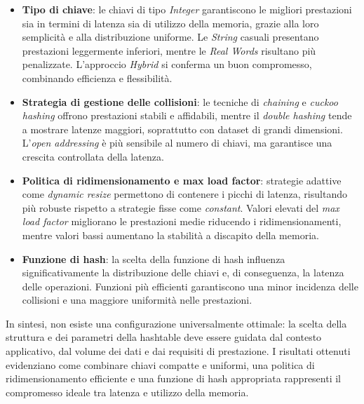 \begin{itemize}
    \item \textbf{Tipo di chiave}: le chiavi di tipo \textit{Integer} garantiscono le migliori prestazioni sia in termini di latenza sia di utilizzo 
    della memoria, grazie alla loro semplicità e alla distribuzione uniforme. Le \textit{String} casuali presentano prestazioni leggermente inferiori, 
    mentre le \textit{Real Words} risultano più penalizzate. L'approccio \textit{Hybrid} si conferma un buon compromesso, combinando efficienza e flessibilità.
    
    \item \textbf{Strategia di gestione delle collisioni}: le tecniche di \textit{chaining} e \textit{cuckoo hashing} offrono prestazioni stabili e affidabili, 
    mentre il \textit{double hashing} tende a mostrare latenze maggiori, soprattutto con dataset di grandi dimensioni. L'\textit{open addressing} 
    è più sensibile al numero di chiavi, ma garantisce una crescita controllata della latenza.
    
    \item \textbf{Politica di ridimensionamento e max load factor}: strategie adattive come \textit{dynamic resize} permettono di contenere i picchi di latenza, 
    risultando più robuste rispetto a strategie fisse come \textit{constant}. Valori elevati del \textit{max load factor} migliorano le prestazioni 
    medie riducendo i ridimensionamenti, mentre valori bassi aumentano la stabilità a discapito della memoria.
    
    \item \textbf{Funzione di hash}: la scelta della funzione di hash influenza significativamente la distribuzione delle chiavi e, di conseguenza, 
    la latenza delle operazioni. Funzioni più efficienti garantiscono una minor incidenza delle collisioni e una maggiore uniformità nelle prestazioni.
\end{itemize}

In sintesi, non esiste una configurazione universalmente ottimale: la scelta della struttura e dei parametri della hashtable deve essere guidata dal contesto 
applicativo, dal volume dei dati e dai requisiti di prestazione.  
I risultati ottenuti evidenziano come combinare chiavi compatte e uniformi, una politica di ridimensionamento efficiente e una funzione di hash 
appropriata rappresenti il compromesso ideale tra latenza e utilizzo della memoria.

